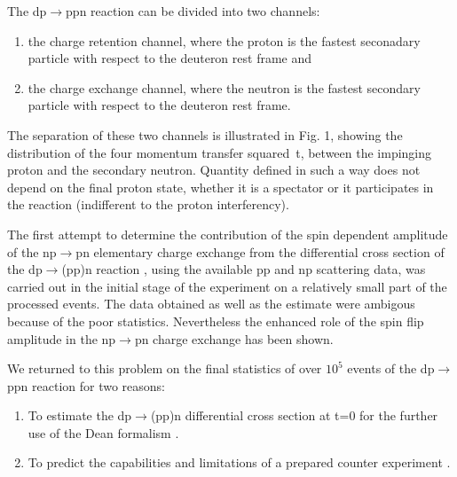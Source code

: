 \documentclass[a4paper,12pt]{article}
\begin{document}
    The  dp$\to$ppn reaction can be divided
    into two channels:\\
    \begin{enumerate}
    \item the charge retention channel, where the proton is the fastest
      seconadary particle with respect to the deuteron rest frame and
    \item the charge exchange channel, where the neutron is the fastest
      secondary particle with respect to the deuteron rest frame.
    \end{enumerate}
    The separation of these two channels is illustrated in Fig. 1, showing
    the distribution of the four momentum transfer squared~t, between the impinging
    proton and the secondary neutron. Quantity defined in such a way does not
    depend on the final proton state, whether it is
    a spectator or it participates in the reaction
    (indifferent to the proton interferency).

    The first attempt to determine the contribution of the spin dependent
    amplitude of the np$\to$pn elementary charge exchange from the differential
    cross section of the dp$\to$(pp)n reaction \cite{Ala}, using the available
    pp and np scattering data, was carried out in the initial stage of the
    experiment on a relatively small part of the processed events. The data obtained
    as well as the estimate were ambigous because of the poor statistics.
    Nevertheless the enhanced role of the spin flip amplitude
    in the np$\to$pn charge exchange has been shown.

    We returned to this problem on the final statistics of over $10^{5}$ events of
    the dp$\to$ppn reaction for two reasons:
    \begin{enumerate}
    \item To estimate the dp$\to$(pp)n differential cross section
      at t=0 for the further use of the Dean formalism \cite{Dea}.
    \item To predict the capabilities and limitations of a prepared counter
      experiment \cite{Baz}.
    \end{enumerate}
\end{document}
